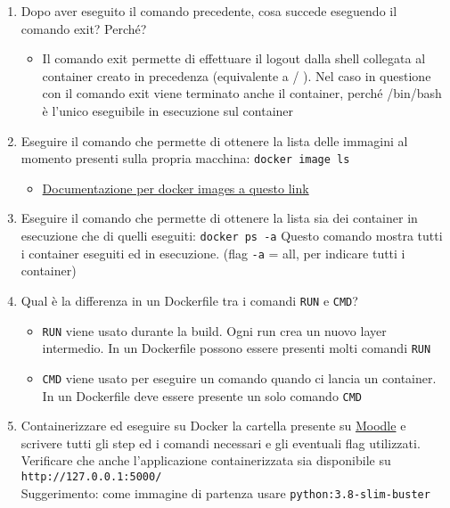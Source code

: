 \begin{enumerate}
    \item Dopo aver eseguito il comando precedente, cosa succede eseguendo il comando exit? Perché?
    \begin{itemize}
        \item Il comando exit permette di effettuare il logout dalla shell collegata al container creato in precedenza (equivalente a  /  ). Nel caso in questione con il comando exit viene terminato anche il container, perché /bin/bash è l’unico eseguibile in esecuzione sul container
    \end{itemize}
    \item Eseguire il comando che permette di ottenere la lista delle immagini al momento presenti sulla propria macchina: \verb|docker image ls|
    \begin{itemize}
        \item \href{https://docs.docker.com/engine/reference/commandline/images/}{Documentazione per docker images a questo link}
    \end{itemize}
    \item Eseguire il comando che permette di ottenere la lista sia dei container in esecuzione che di quelli eseguiti: \verb|docker ps -a|
    Questo comando mostra tutti i container eseguiti ed in esecuzione. (flag \verb|-a| = all, per indicare tutti i container)

    \item Qual è la differenza in un Dockerfile tra i comandi \verb|RUN| e \verb|CMD|?
    \begin{itemize}
        \item \verb|RUN| viene usato durante la build. Ogni run crea un nuovo layer intermedio. In un Dockerfile possono essere presenti molti comandi \verb|RUN|
        \item \verb|CMD| viene usato per eseguire un comando quando ci lancia un container. In un Dockerfile deve essere presente un solo comando \verb|CMD|
    \end{itemize}
    \item Containerizzare ed eseguire su Docker la cartella  presente su \href{https://elearning.di.unipi.it/enrol/index.php?id=334}{Moodle} e scrivere tutti gli step ed i comandi necessari e gli eventuali flag utilizzati. Verificare che anche l’applicazione containerizzata sia disponibile su \verb|http://127.0.0.1:5000/|\\
    Suggerimento: come immagine di partenza usare \verb|python:3.8-slim-buster|    


\end{enumerate}
